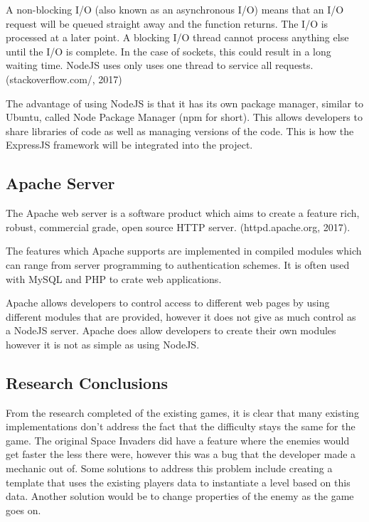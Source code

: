 \documentclass[12pt]{article}
\begin{document}
A non-blocking I/O (also known as an asynchronous I/O) means that an I/O request will be queued straight away and the function returns. The I/O is processed at a later point. A blocking I/O thread cannot process anything else until the I/O is complete. In the case of sockets, this could result in a long waiting time. NodeJS uses only uses one thread to service all requests. (stackoverflow.com/, 2017)

The advantage of using NodeJS is that it has its own package manager, similar to Ubuntu, called Node Package Manager (npm for short). This allows developers to share libraries of code as well as managing versions of the code. This is how the ExpressJS framework will be integrated into the project.

\begin{center}
	\subsection{Apache Server}
\end{center}
The Apache web server is a software product which aims to create a feature rich, robust, commercial grade, open source HTTP server. (httpd.apache.org, 2017). 

The features which Apache supports are implemented in compiled modules which can range from server programming to authentication schemes. It is often used with MySQL and PHP to crate web applications.

Apache allows developers to control access to different web pages by using different modules that are provided, however it does not give as much control as a NodeJS server. Apache does allow developers to create their own modules however it is not as simple as using NodeJS.

\begin{center}
	\subsection{Research Conclusions}
\end{center}
From the research completed of the existing games, it is clear that many existing implementations don't address the fact that the difficulty stays the same for the game. The original Space Invaders did have a feature where the enemies would get faster the less there were, however this was a bug that the developer made a mechanic out of. Some solutions to address this problem include creating a template that uses the existing players data to instantiate a level based on this data. Another solution would be to change properties of the enemy as the game goes on. 
\end{document}
